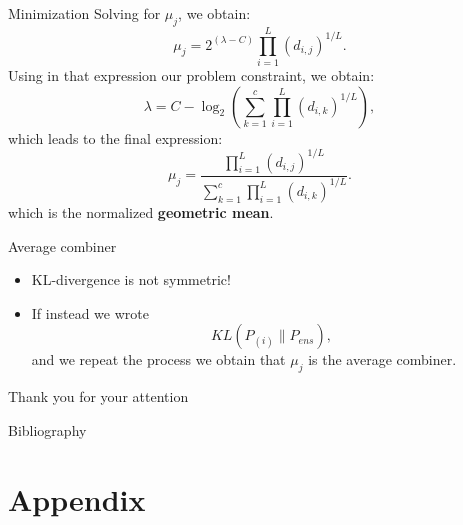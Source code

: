 \documentclass[xcolor=table]{beamer}
\begin{document}
\begin{frame}{Minimization}
    Solving for \(\mu_j\), we obtain:
    \[
    \mu_j = 2^{(\lambda - C)} \prod_{i=1}^L (d_{i,j})^{1/L}.
    \]
    Using in that expression our problem constraint, we obtain:
    \[
    \lambda = C - \log_2 \left(\sum_{k=1}^c \prod_{i=1}^L (d_{i,k})^{1/L}\right),
    \]
    \pause
    which leads to the final expression:
    \[
    \mu_j = \frac{\prod_{i=1}^L(d_{i,j})^{1/L}}{\sum_{k=1}^c \prod_{i=1}^L (d_{i,k})^{1/L}}.
    \]
    which is the normalized \textbf{geometric mean}.
\end{frame}

\begin{frame}{Average combiner}

\begin{itemize}
    \item KL-divergence is not symmetric!
    \item If instead we wrote
    \[
    KL (P_{(i)} \parallel P_{ens}),
    \]
    and we repeat the process we obtain that \(\mu_j\) is the average combiner.
\end{itemize}
    
\end{frame}

\begin{frame}{}
    \begin{center}
        Thank you for your attention
    \end{center}
\end{frame}




  \begin{frame}[noframenumbering]{Bibliography}

  
  

  \end{frame}

  \section*{Appendix}
\end{document}
